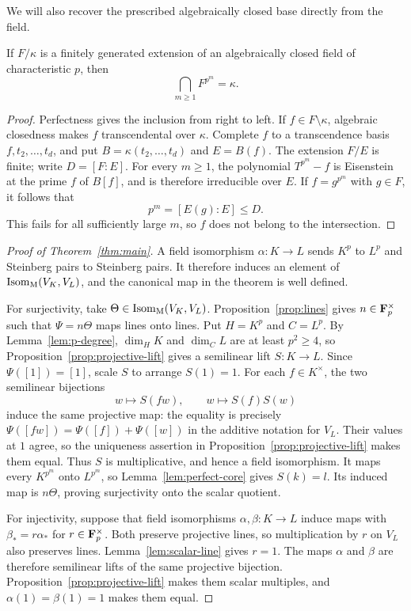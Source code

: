 We will also recover the prescribed algebraically closed base directly
from the field.

\begin{lemma}\label{lem:perfect-core}
If $F/\kappa$ is a finitely generated extension of an algebraically
closed field of characteristic $p$, then
\[
 \bigcap_{m\ge1} F^{p^m}=\kappa.
\]
\end{lemma}

\begin{proof}
Perfectness gives the inclusion from right to left. If $f\in
F\setminus\kappa$, algebraic closedness makes $f$ transcendental over
$\kappa$. Complete $f$ to a transcendence basis
$f,t_2,\ldots,t_d$, and put
$B=\kappa(t_2,\ldots,t_d)$ and $E=B(f)$. The extension $F/E$ is
finite; write $D=[F:E]$. For every $m\ge1$, the polynomial
$T^{p^m}-f$ is Eisenstein at the prime $f$ of $B[f]$, and is therefore
irreducible over $E$. If $f=g^{p^m}$ with $g\in F$, it follows that
\[
 p^m=[E(g):E]\le D.
\]
This fails for all sufficiently large $m$, so $f$ does not belong to
the intersection.
\end{proof}

\begin{proof}[Proof of Theorem~\ref{thm:main}]
A field isomorphism $\alpha:K\to L$ sends $K^p$ to $L^p$ and
Steinberg pairs to Steinberg pairs. It therefore induces an element
of $\operatorname{Isom}_{\mathrm M}(V_K,V_L)$, and the canonical map in the theorem
is well defined.

For surjectivity, take $\Theta\in\operatorname{Isom}_{\mathrm M}(V_K,V_L)$.
Proposition~\ref{prop:lines} gives $n\in\mathbf F_p^\times$ such that
$\Psi=n\Theta$ maps lines onto lines. Put $H=K^p$ and $C=L^p$.
By Lemma~\ref{lem:p-degree}, $\dim_H K$ and $\dim_C L$ are at least
$p^2\ge4$, so
Proposition~\ref{prop:projective-lift} gives a semilinear lift
$S:K\to L$. Since $\Psi([1])=[1]$, scale $S$ to arrange $S(1)=1$.
For each $f\in K^\times$, the two semilinear bijections
\[
 w\longmapsto S(fw),\qquad w\longmapsto S(f)S(w)
\]
induce the same projective map: the equality is precisely
$\Psi([fw])=\Psi([f])+\Psi([w])$ in the additive notation for $V_L$.
Their values at $1$ agree, so the uniqueness assertion in
Proposition~\ref{prop:projective-lift} makes them equal. Thus $S$ is
multiplicative, and hence a field isomorphism. It maps every
$K^{p^m}$ onto $L^{p^m}$, so Lemma~\ref{lem:perfect-core} gives
$S(k)=l$. Its induced map is $n\Theta$, proving surjectivity onto the
scalar quotient.

For injectivity, suppose that field isomorphisms $\alpha,\beta:K\to L$
induce maps with $\beta_*=r\alpha_*$ for $r\in\mathbf F_p^\times$.
Both preserve projective lines, so multiplication by $r$ on $V_L$
also preserves lines. Lemma~\ref{lem:scalar-line} gives $r=1$.
The maps $\alpha$ and $\beta$ are therefore semilinear lifts of the
same projective bijection. Proposition~\ref{prop:projective-lift}
makes them scalar multiples, and $\alpha(1)=\beta(1)=1$ makes them
equal.
\end{proof}

